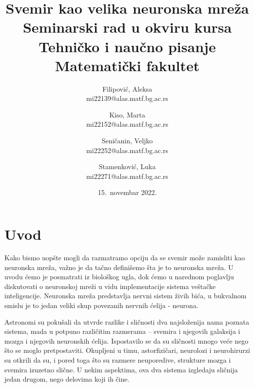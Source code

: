 \documentclass[a4paper]{article}
\begin{document}
\title{Svemir kao velika neuronska mreža\\ \small{Seminarski rad u okviru kursa\\Tehničko i naučno pisanje\\ Matematički fakultet}}

\author{
    Filipović, Aleksa\\ 
    mi22139@alas.matf.bg.ac.rs
    \and
    Kiso, Marta\\ 
    mi22152@alas.matf.bg.ac.rs
    \and
    Seničanin, Veljko\\ 
    mi22252@alas.matf.bg.ac.rs
    \and
    Stamenković, Luka\\ 
    mi22271@alas.matf.bg.ac.rs
}
\date{15.~novembar 2022.}
\maketitle
{}
\tableofcontents

\newpage

\section{Uvod}
\label{sec:uvod}
\justifying
Kako bismo uopšte mogli da razmatramo opciju da se svemir može zamisliti kao neuronska mreža, važno je da tačno definišemo šta je to neuronska mreža. U uvodu ćemo je posmatrati iz biološkog ugla, dok ćemo u narednom poglavlju diskutovati o neuronskoj mreži u vidu implementacije sistema veštačke inteligencije. Neuronska mreža predstavlja nervni sistem živih bića, u bukvalnom smislu je to jedan veliki skup povezanih nervnih ćelija - neurona.  

Astronomi su pokušali da utvrde razlike i sličnosti dva najsloženija nama poznata sistema, mada u potpuno različitim razmerama – svemira i njegovih galaksija i mozga i njegovih neuronskih ćelija. Ispostavilo se da su sličnosti mnogo veće nego što se moglo pretpostaviti. Okupljeni u timu, astorfizičari, neurolozi i neurohirurzi su otkrili da su, i pored toga što su razmere neuporedive, strukture mozga i svemira izuzetno slične. U nekim aspektima, ova dva sistema izgledaju sličnija jedan drugom, nego delovima koji ih čine.  
\end{document}
